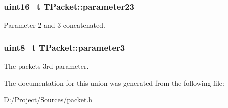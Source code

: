 \subsubsection[{parameter23}]{\setlength{\rightskip}{0pt plus 5cm}uint16\+\_\+t T\+Packet\+::parameter23}\label{union_t_packet_a92905f7e01f01bd1439dc4668b6808c1}
Parameter 2 and 3 concatenated. \hypertarget{union_t_packet_ab3ac2f9a6cfe5b6a7ae0987d21de472b}{}
\subsubsection[{parameter3}]{\setlength{\rightskip}{0pt plus 5cm}uint8\+\_\+t T\+Packet\+::parameter3}\label{union_t_packet_ab3ac2f9a6cfe5b6a7ae0987d21de472b}
The packet\textquotesingle{}s 3rd parameter. 

The documentation for this union was generated from the following file\+:\begin{DoxyCompactItemize}
\item 
D\+:/\+Project/\+Sources/\hyperlink{packet_8h}{packet.\+h}\end{DoxyCompactItemize}
